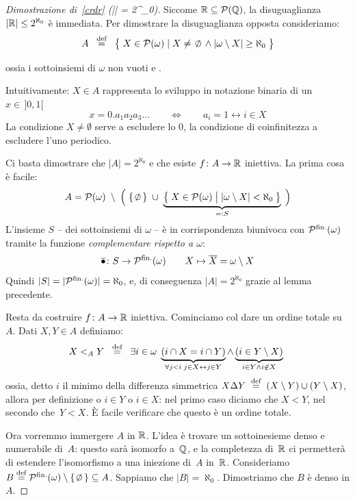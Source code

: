 \begin{proof}[Dimostrazione di~\ref{crdr} {\drkred(\mathshift|\RR| =
2^{\aleph_0}\mathshift)}]
	Siccome $\mathbb R \subseteq \mathcal{P}(\mathbb Q)$, la disuguaglianza $|\mathbb R| \leq
2^{\aleph_0}$ \`e immediata. Per dimostrare la disuguaglianza opposta
consideriamo:
	\[ A \;\;\Mydef\;\; \big\oldparen\;X \in \ps(\omega)\; |\; X \ne
\emptyset \land |\omega \setminus X| \geq \aleph_0\;\big\}
		\]
	{\drkgrn ossia i sottoinsiemi di $\omega$ non vuoti e .

	Intuitivamente: $X \in A$ rappresenta lo sviluppo in notazione
binaria di un $x \in\, ]0,1[$
\[ x = 0.a_1a_2a_3 \ldots \qquad \iff \qquad a_i = 1 \leftrightarrow i \in
X\]
La condizione $X \ne \emptyset$ serve a escludere lo $0$, la 
	condizione di coinfinitezza a escludere l'uno periodico.}

	Ci basta dimostrare che $|A| = 2^{\aleph_0}$ e che esiste $f
\colon A \rightarrow \mathbb R$ iniettiva. La prima cosa \`e facile:
	\[ A = \ps(\omega)\;\setminus\; \Big(\;\{\emptyset\} \;\cup\;
\underbrace{\big\oldparen\: X \in \ps(\omega)\;\big|\; |\omega \setminus
X|<\aleph_0\:\big\}}_{=: S}\;\Big)
		\]
	L'insieme $S$ -- dei sottoinsiemi di $\omega$  --
\`e in corrispondenza biunivoca con $\mathcal{P}^{\text{fin.}}(\omega)$ tramite la funzione
\textit{complementare rispetto a $\omega$}:
	\[ \overline \bullet \colon S \rightarrow \mathcal{P}^{\text{fin.}}(\omega) \qquad X \mapsto \overline X = \omega \setminus X
		\]
	Quindi $|S| = |\mathcal{P}^{\text{fin.}}(\omega)| = \aleph_0$, e, di conseguenza $|A| = 2^{\aleph_0}$ grazie al lemma precedente.

	Resta da costruire $f \colon A \rightarrow \mathbb R$ iniettiva.
	Cominciamo col dare un ordine totale su $A$. Dati $X,Y \in A$ definiamo:
	\[ X <_A Y \;\;\overset{\text{def}}{=}\;\; \exists {i \in \omega} \; \underbrace{(i
\cap X = i \cap Y)}_{\forall {j < i} \; j \in X \leftrightarrow j \in Y} \land \underbrace{(i \in Y \setminus X)}_{i \in Y \land i \not\in X}\
		\]
	ossia, detto $i$ il minimo della differenza simmetrica $X \Delta Y
\;\overset{\text{def}}{=}\; (X \setminus Y) \cup (Y \setminus X)$, allora per definizione o
$i\in Y$ o $i\in X$: nel primo caso diciamo che $X<Y$, nel secondo
che~$Y<X$.
\`E facile verificare che questo \`e un ordine totale.

Ora vorremmo immergere $A$ in $\mathbb R$. L'idea \`e trovare un sottoinesieme
denso e numerabile di~$A$: questo sar\`a isomorfo a~$\mathbb Q$, e la
completezza di~$\mathbb R$ ci permetter\`a di estendere l'isomorfismo a una
iniezione di~$A$ in~$\mathbb R$. Consideriamo $B \Mydef \psf(\omega) \setminus \{\emptyset\} \subseteq A$.
Sappiamo che $|B| = \aleph_0$. Dimostriamo che $B$ \`e denso in $A$.


\end{proof}
